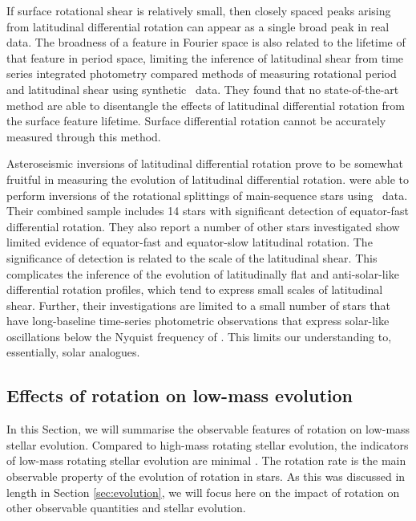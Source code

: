 If surface rotational shear is relatively small, then closely spaced peaks arising from latitudinal differential rotation can appear as a single broad peak in real data.
The broadness of a feature in Fourier space is also related to the lifetime of that feature in period space, limiting the inference of latitudinal shear from time series integrated photometry
\citet{aigrain_hare_2015} compared methods of measuring rotational period and latitudinal shear using synthetic \kepler\ data.
They found that no state-of-the-art method \citep[e.g., those adopted by ][]{reinhold_rotation_2013, mcquillan_rotation_2014, garcia_rotation_2014} are able to disentangle the effects of latitudinal differential rotation from the surface feature lifetime.
Surface differential rotation cannot be accurately measured through this method.

Asteroseismic inversions of latitudinal differential rotation prove to be somewhat fruitful in measuring the evolution of latitudinal differential rotation.
\citet{benomar_asteroseismic_2018, bazot_latitudinal_2019, hall_weakened_2021} were able to perform inversions of the rotational splittings of main-sequence stars using \kepler\ data.
Their combined sample includes 14 stars with significant detection of equator-fast differential rotation.
They also report a number of other stars investigated show limited evidence of equator-fast and equator-slow latitudinal rotation.
The significance of detection is related to the scale of the latitudinal shear.
This complicates the inference of the evolution of latitudinally flat and anti-solar-like differential rotation profiles, which tend to express small scales of latitudinal shear.
Further, their investigations are limited to a small number of stars that have long-baseline time-series photometric observations that express solar-like oscillations below the Nyquist frequency of \kepler{}.
This limits our understanding to, essentially, solar analogues.


\subsection{Effects of rotation on low-mass evolution}
\label{sec:effects}

In this Section, we will summarise the observable features of rotation on low-mass stellar evolution.
Compared to high-mass rotating stellar evolution, the indicators of low-mass rotating stellar evolution are minimal \citep[see, e.g.,][]{heger_presupernova_2000, maeder_evolution_2000}.
The rotation rate is the main observable property of the evolution of rotation in stars.
As this was discussed in length in Section \ref{sec:evolution}, we will focus here on the impact of rotation on other observable quantities and stellar evolution.

